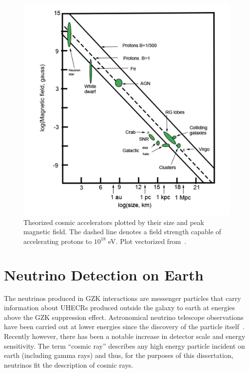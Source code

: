 \begin{figure}
	\centering
	\includegraphics[width=\textwidth]{figures/cosmicAccelerators_trace}
	\caption{Theorized cosmic accelerators plotted by their size and peak magnetic field.  The dashed line denotes a field strength capable of accelerating protons to $10^{18}$ eV. Plot vectorized from~\cite{RevModPhys.71.S33}. }
	\label{fig:cosmicAccels}
\end{figure}


\section{Neutrino Detection on Earth}
	The neutrinos produced in GZK interactions are messenger particles that carry information about UHECRs produced outside the galaxy to earth at energies above the GZK suppression effect.  Astronomical neutrino telescope observations have been carried out at lower energies since the discovery of the particle itself~\cite{Homestake}. Recently however, there has been a notable increase in detector scale and energy sensitivity.  The term ``cosmic ray'' describes any high energy particle incident on earth (including gamma rays) and thus, for the purposes of this dissertation, neutrinos fit the description of cosmic rays.
	
